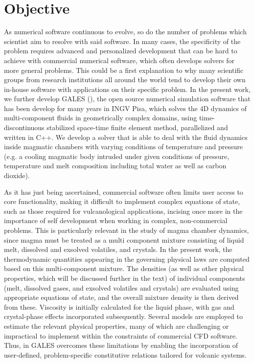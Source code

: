 \section*{Objective}
As numerical software continuous to evolve, so do the number of problems which scientist aim to resolve with said software. In many cases, the specificity of the problem requires advanced and personalized development that can be hard to achieve with commercial numerical software, which often develops solvers for more general problems. This could be a first explanation to why many scientific groups from research institutions all around the world tend to develop their own in-house software with applications on their specific problem. In the present work, we further develop GALES (\cite{garg2022}), the open source numerical simulation software that has been develop for many years in INGV Pisa, which solves the 4D dynamics of multi-component fluids in geometrically complex domains, using time-discontinuous stabilized space-time finite element method, parallelized and written in C++. We develop a solver that is able to deal with the fluid dynamics inside magmatic chambers with varying conditions of temperature and pressure (e.g. a cooling magmatic body intruded under given conditions of pressure, temperature and melt composition including total water as well as carbon dioxide).

As it has just being ascertained, commercial software often limits user access to core functionality, making it difficult to implement complex equations of state, such as those required for vulcanological applications, incising once more in the importance of self development when working in complex, non-commercial problems. This is particularly relevant in the study of magma chamber dynamics, since magma must be treated as a multi component mixture consisting of liquid melt, dissolved and exsolved volatiles, and crystals. In the present work, the  thermodynamic quantities appearing in the governing physical laws are computed based on this multi-component mixture. The densities (as well as other physical properties, which will be discussed further in the text) of individual components (melt, dissolved gases, and exsolved volatiles and crystals) are evaluated using appropriate equations of state, and the overall mixture density is then derived from these. Viscosity is initially calculated for the liquid phase, with gas and crystal-phase effects incorporated subsequently. Several models are employed to estimate the relevant physical properties, many of which are challenging or impractical to implement within the constraints of commercial CFD software. Thus, in GALES overcomes these limitations by enabling the incorporation of user-defined, problem-specific constitutive relations tailored for volcanic systems. 

